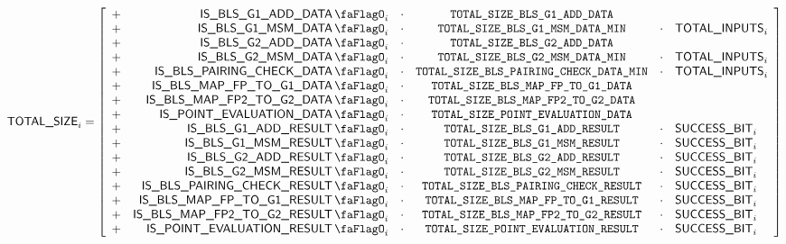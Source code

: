 \[
    \blsTotalSize _{i}
    =
    \left[ \begin{array}{crcccl}
        + & \isBlsGOneAddData  _{i} & \cdot & \totalSizeBlsGOneAddData    \\
        + & \isBlsGOneMsmData  _{i} & \cdot & \totalSizeBlsGOneMsmDataMin & \cdot & \totalInputs      _{i} \\
        + & \isBlsGTwoAddData  _{i} & \cdot & \totalSizeBlsGTwoAddData    \\
        + & \isBlsGTwoMsmData  _{i} & \cdot & \totalSizeBlsGTwoMsmDataMin & \cdot & \totalInputs      _{i} \\
        + & \isBlsPairingCheckData _{i} & \cdot & \totalSizeBlsPairingCheckDataMin & \cdot & \totalInputs _{i} \\
        + & \isBlsMapFpToGOneData _{i} & \cdot & \totalSizeBlsMapFpToGOneData \\
        + & \isBlsMapFpTwoToGTwoData _{i} & \cdot & \totalSizeBlsMapFpTwoToGTwoData \\
        + & \isPointEvaluationData _{i} & \cdot & \totalSizePointEvaluationData \\
        + & \isBlsGOneAddResult _{i} & \cdot & \totalSizeBlsGOneAddResult & \cdot & \blsSuccessBit _{i} \\
        + & \isBlsGOneMsmResult _{i} & \cdot & \totalSizeBlsGOneMsmResult & \cdot & \blsSuccessBit _{i} \\
        + & \isBlsGTwoAddResult _{i} & \cdot & \totalSizeBlsGTwoAddResult & \cdot & \blsSuccessBit _{i} \\
        + & \isBlsGTwoMsmResult _{i} & \cdot & \totalSizeBlsGTwoMsmResult & \cdot & \blsSuccessBit _{i} \\
        + & \isBlsPairingCheckResult _{i} & \cdot & \totalSizeBlsPairingCheckResult & \cdot & \blsSuccessBit _{i} \\
        + & \isBlsMapFpToGOneResult _{i} & \cdot & \totalSizeBlsMapFpToGOneResult & \cdot & \blsSuccessBit _{i} \\
        + & \isBlsMapFpTwoToGTwoResult _{i} & \cdot & \totalSizeBlsMapFpTwoToGTwoResult & \cdot & \blsSuccessBit _{i} \\
        + & \isPointEvaluationResult _{i} & \cdot & \totalSizePointEvaluationResult & \cdot & \blsSuccessBit _{i} \\
    \end{array} \right]
\]


